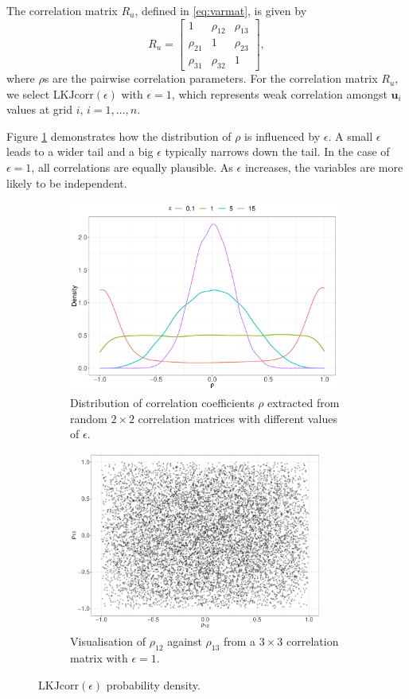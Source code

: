 \documentclass[a4paper]{article}   	%
\begin{document}
	The  correlation matrix $R_u$, defined in \eqref{eq:varmat}, is given by
	\begin{equation}\label{eq:RMat}
		R_u = \begin{bmatrix}
			1 & \rho_{12} &\rho_{13}  \\ \rho_{21} & 1 & \rho_{23} \\ \rho_{31} & \rho_{32} & 1 
		\end{bmatrix},
	\end{equation}
	where $\rho$s are the pairwise correlation parameters. For the correlation matrix $R_u$, we select $\mbox{LKJcorr}(\epsilon)$ with $\epsilon = 1$, which represents weak correlation amongst $\bm{u}_i$ values at grid $i$, $i=1,\ldots, n$.  
	
	Figure \ref{fig:LKJdensity} demonstrates how the distribution of $\rho$ is influenced by $\epsilon$. A small $\epsilon$ leads to a wider tail and a big $\epsilon$ typically narrows down the tail. In the case of $\epsilon = 1$, all correlations are equally plausible. As $\epsilon$ increases, the variables are more likely to be independent. 
	
	\begin{figure}[!htp]
		\centering	
		\begin{subfigure}[t]{0.45\textwidth}
			\centering
			\includegraphics[height=6.3cm,width=\linewidth]{Images/LKJdensity}
			\caption{Distribution of correlation coefficients $\rho$ extracted from random $2\times2$ correlation matrices with different values of $\epsilon$.}
		\end{subfigure} 
		\space
		\begin{subfigure}[t]{0.45\textwidth}
			\centering
			\includegraphics[height=5.9cm,width=\linewidth]{Images/LKJdensity2D}
			\caption{Visualisation of $\rho_{12}$ against $\rho_{13}$ from a $3\times3$ correlation matrix with $\epsilon=1$.}
		\end{subfigure}
		\caption{$\text{LKJcorr}(\epsilon)$ probability density. }\label{fig:LKJdensity}
	\end{figure}
	
\end{document}
